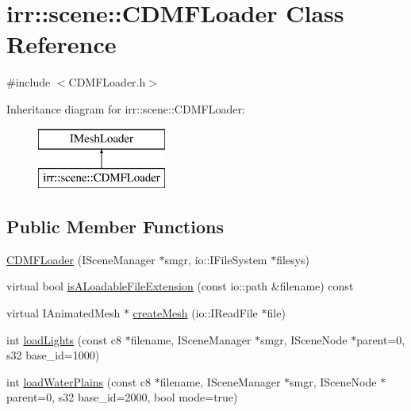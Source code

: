 \hypertarget{classirr_1_1scene_1_1_c_d_m_f_loader}{\section{irr\-:\-:scene\-:\-:C\-D\-M\-F\-Loader Class Reference}
\label{classirr_1_1scene_1_1_c_d_m_f_loader}
}


{\ttfamily \#include $<$C\-D\-M\-F\-Loader.\-h$>$}

Inheritance diagram for irr\-:\-:scene\-:\-:C\-D\-M\-F\-Loader\-:\begin{figure}[H]
\begin{center}
\leavevmode
\includegraphics[height=2.000000cm]{classirr_1_1scene_1_1_c_d_m_f_loader}
\end{center}
\end{figure}
\subsection*{Public Member Functions}
\begin{DoxyCompactItemize}
\item 
\hyperlink{classirr_1_1scene_1_1_c_d_m_f_loader_a15a217939acac8c732a489405a08ae70}{C\-D\-M\-F\-Loader} (I\-Scene\-Manager $\ast$smgr, io\-::\-I\-File\-System $\ast$filesys)
\item 
virtual bool \hyperlink{classirr_1_1scene_1_1_c_d_m_f_loader_afd8eed83fde54a7e7af88a70642e0ebd}{is\-A\-Loadable\-File\-Extension} (const io\-::path \&filename) const 
\item 
virtual I\-Animated\-Mesh $\ast$ \hyperlink{classirr_1_1scene_1_1_c_d_m_f_loader_ad0a26f69a5ae1b5c612ab0593f2f2b63}{create\-Mesh} (io\-::\-I\-Read\-File $\ast$file)
\item 
int \hyperlink{classirr_1_1scene_1_1_c_d_m_f_loader_aa8edb30a292bff34cacbebfb380f53b8}{load\-Lights} (const c8 $\ast$filename, I\-Scene\-Manager $\ast$smgr, I\-Scene\-Node $\ast$parent=0, s32 base\-\_\-id=1000)
\item 
int \hyperlink{classirr_1_1scene_1_1_c_d_m_f_loader_a12a5dd1e41aac791d632a4931b049549}{load\-Water\-Plains} (const c8 $\ast$filename, I\-Scene\-Manager $\ast$smgr, I\-Scene\-Node $\ast$parent=0, s32 base\-\_\-id=2000, bool mode=true)
\end{DoxyCompactItemize}


